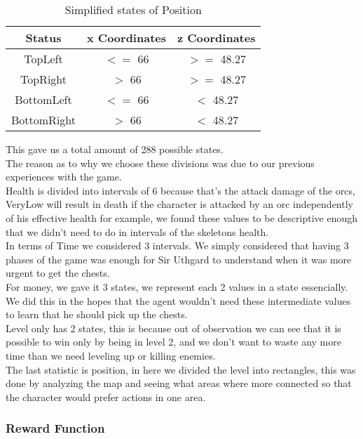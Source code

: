 \documentclass{article}
\begin{document}
  \begin{table}[h!]
    \centering
    \caption{Simplified states of Position}
    \label{tab:tableA*5}
    \begin{tabular}{c|c|c}
      \textbf{Status} & \textbf{x Coordinates} & \textbf{z Coordinates}\\
      \hline
      TopLeft & $<=$ 66 & $>=$ 48.27\\
      TopRight & $>$ 66 & $>=$ 48.27\\
      BottomLeft & $<=$ 66 & $<$ 48.27\\
      BottomRight & $>$ 66 & $<$ 48.27\\
    \end{tabular}
  \end{table}
  \newpage
  \noindent
  This gave us a total amount of 288 possible states.\\
  The reason as to why we choose these divisions was due to our previous experiences with the game.\\
  Health is divided into intervals of 6 because that's the attack damage of the orcs, VeryLow will result in death if the
  character is attacked by an orc independently of his effective health for example, we found these values to be descriptive enough that we
  didn't need to do in intervals of the skeletons health.\\
  In terms of Time we considered 3 intervals. We simply considered that having 3 phases of the game was enough for Sir Uthgard to understand when it was more urgent to get the chests.\\
  For money, we gave it 3 states, we represent each 2 values in a state essencially. We did this in the hopes that the agent wouldn't need these intermediate values to learn that he should pick up the chests.\\
  Level only has 2 states, this is because out of observation we can see that it is possible to win only by being in level 2, and we don't want
  to waste any more time than we need leveling up or killing enemies.\\
  The last statistic is position, in here we divided the level into rectangles, this was done by analyzing the map and seeing what areas where more
  connected so that the character would prefer actions in one area.\\

  \subsubsection{Reward Function}
\end{document}

